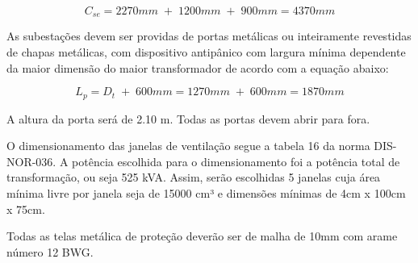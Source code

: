 \begin{equation}
    C_{se} = 2270mm \;+\; 1200mm \;+\; 900mm  = 4370mm
\end{equation}


As subestações devem ser providas de portas metálicas ou inteiramente revestidas de chapas metálicas, com dispositivo antipânico com largura mínima dependente da maior dimensão do maior transformador de acordo com a equação abaixo:

\begin{equation}
    L_p = D_t \;+\; 600mm = 1270mm \;+\; 600mm = 1870mm
\end{equation}

A altura da porta será de 2.10 m. Todas as portas devem abrir para fora.


O dimensionamento das janelas de ventilação segue a tabela 16 da norma DIS-NOR-036. A potência escolhida para o dimensionamento foi a potência total de transformação, ou seja 525 kVA. Assim, serão escolhidas 5 janelas cuja área mínima livre por janela seja de 15000 cm³ e dimensões mínimas de 4cm x 100cm x 75cm. 

Todas as telas metálica de proteção deverão ser de malha de 10mm com arame número 12 BWG. 